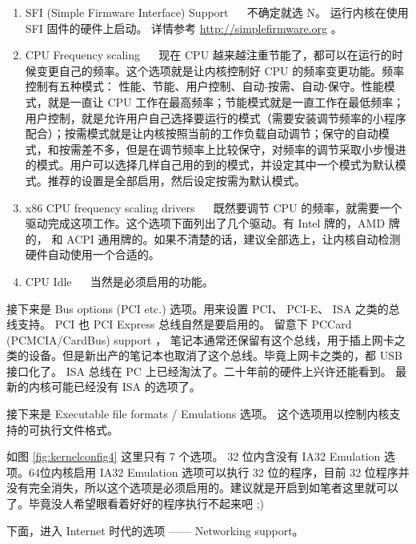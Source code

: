 \begin{enumerate}
\item SFI (Simple Firmware Interface) Support ~~ 不确定就选 N。 运行内核在使用 SFI 固件的硬件上启动。 详情参考 \url{http://simplefirmware.org} 。

\item CPU Frequency scaling ~~ 现在 CPU 越来越注重节能了，都可以在运行的时候变更自己的频率。这个选项就是让内核控制好 CPU 的频率变更功能。频率控制有五种模式： 性能、节能、用户控制、自动-按需、自动-保守。性能模式，就是一直让 CPU 工作在最高频率；节能模式就是一直工作在最低频率；用户控制，就是允许用户自己选择要运行的模式（需要安装调节频率的小程序配合）；按需模式就是让内核按照当前的工作负载自动调节；保守的自动模式，和按需差不多，但是在调节频率上比较保守，对频率的调节采取小步慢进的模式。用户可以选择几样自己用的到的模式，并设定其中一个模式为默认模式。推荐的设置是全部启用，然后设定按需为默认模式。 

\item x86 CPU frequency scaling drivers ~~ 既然要调节 CPU 的频率，就需要一个驱动完成这项工作。这个选项下面列出了几个驱动。有 Intel 牌的，AMD 牌的， 和 ACPI 通用牌的。如果不清楚的话，建议全部选上，让内核自动检测硬件自动使用一个合适的。

\item CPU Idle ~~ 当然是必须启用的功能。

\end{enumerate}

接下来是 Bus options (PCI etc.) 选项。用来设置 PCI、 PCI-E、 ISA 之类的总线支持。
PCI 也 PCI Express 总线自然是要启用的。 留意下 PCCard (PCMCIA/CardBus) support ， 笔记本通常还保留有这个总线，用于插上网卡之类的设备。但是新出产的笔记本也取消了这个总线。毕竟上网卡之类的，都 USB 接口化了。
ISA 总线在 PC 上已经淘汰了。二十年前的硬件上兴许还能看到。 最新的内核可能已经没有 ISA 的选项了。

接下来是  Executable file formats / Emulations 选项。 这个选项用以控制内核支持的可执行文件格式。


如图 \ref{fig:kernelconfig4} 这里只有 7 个选项。 32 位内含没有 IA32 Emulation 选项。64位内核启用 IA32 Emulation 选项可以执行 32 位的程序，目前 32 位程序并没有完全消失，所以这个选项是必须启用的。建议就是开启到如笔者这里就可以了。毕竟没人希望眼看着好好的程序执行不起来吧 ;)


下面，进入 Internet 时代的选项 —— Networking support。

